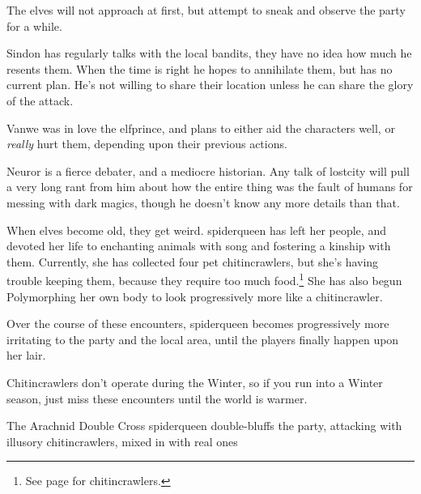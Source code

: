 \begin{multicols}{2}
The elves will not approach at first, but attempt to sneak and observe the party for a while.


Sindon has regularly talks with the local bandits, they have no idea how much he resents them.
When the time is right he hopes to annihilate them, but has no current plan.
He's not willing to share their location unless he can share the glory of the attack.


Vanwe was in love the \gls{elfprince}, and plans to either aid the characters well, or \emph{really} hurt them, depending upon their previous actions.

Neuror is a fierce debater, and a mediocre historian.  Any talk of \gls{lostcity} will pull a very long rant from him about how the entire thing was the fault of humans for messing with dark magics, though he doesn't know any more details than that.

\label{neuror}

\stopcontents[sq]

\resumecontents[Villages]
\stopcontents[Villages]

\startcontents[sq]

\sqminitoc

\noindent
When elves become old, they get weird.
\Gls{spiderqueen} has left her people, and devoted her life to enchanting animals with song and fostering a kinship with them.
Currently, she has collected four pet chitincrawlers, but she's having trouble keeping them, because they require too much food.\footnote{See page \pageref{chitincrawler} for chitincrawlers.}
She has also begun Polymorphing her own body to look progressively more like a chitincrawler.

Over the course of these encounters, \gls{spiderqueen} becomes progressively more irritating to the party and the local area, until the players finally happen upon her lair.

Chitincrawlers don't operate during the Winter, so if you run into a Winter season, just miss these encounters until the world is warmer.

{The Arachnid Double Cross}%
{\Gls{spiderqueen} double-bluffs the party, attacking with illusory chitincrawlers, mixed in with real ones}%
\label{spiderqueenssong}


\end{multicols}
